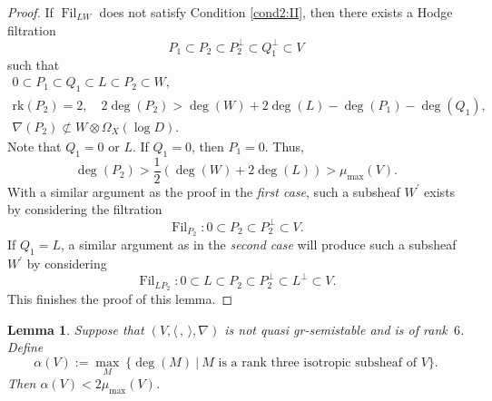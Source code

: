 \documentclass[11pt]{article}
\numberwithin{equation}{section}
\newcommand{\grsemistable}{gr\nobreakdash-semi\-stable\xspace}
\DeclareMathOperator{\Filt}{Fil}
\newcommand{\rk}{\mathrm{rk}}
\theoremstyle{plain}
\newtheorem{lem}[thm]{Lemma}
\theoremstyle{definition}
\begin{document}
\begin{proof}
If $\Filt_{LW}$ does not satisfy Condition \eqref{cond2:II}, then there exists a Hodge filtration
\[
P_1\subset P_2\subset P_2^\perp\subset Q_1^\perp\subset V
\]
such that
\begin{gather*}
0\subset P_1\subset Q_1\subset L \subset P_2\subset W,
\\
\rk(P_2)=2,\quad 2\deg(P_2)>\deg(W)+2\deg(L)-\deg(P_1)-\deg(Q_1),
\\
\tag*{and}
\nabla(P_2)\not\subset W\otimes\Omega_X(\log D).
\end{gather*}
Note that $Q_1=0$ or $L$. If $Q_1=0$, then $P_1=0$. Thus,
\[
\deg(P_2)>\dfrac{1}{2}(\deg(W)+2\deg(L))>\mu_{\max}(V).
\]
With a similar argument as the proof in the \emph{first case}, such a subsheaf $W^\prime$ exists by considering the filtration
\[
\Filt_{P_2}:0\subset P_2\subset P_2^\perp\subset V.
\]
If $Q_1=L$, a similar argument as in the \emph{second case} will produce such a subsheaf $W^\prime$ by considering
\[
\Filt_{LP_2}:0\subset L\subset P_2\subset P_2^\perp\subset L^\perp\subset V.
\]
This finishes the proof of this lemma.
\end{proof}

\begin{lem}\label{lagrange}
Suppose that $(V,\langle \,, \, \rangle,\nabla)$ is not quasi \grsemistable and is of rank~$6$. Define
\[
\alpha(V):=\max_{M}\ \{\deg(M)\ |\ M \text{ is a rank three isotropic subsheaf of $V$}\}.
\]
Then $\alpha(V)<2\mu_{\max}(V)$.
\end{lem}
\end{document}
